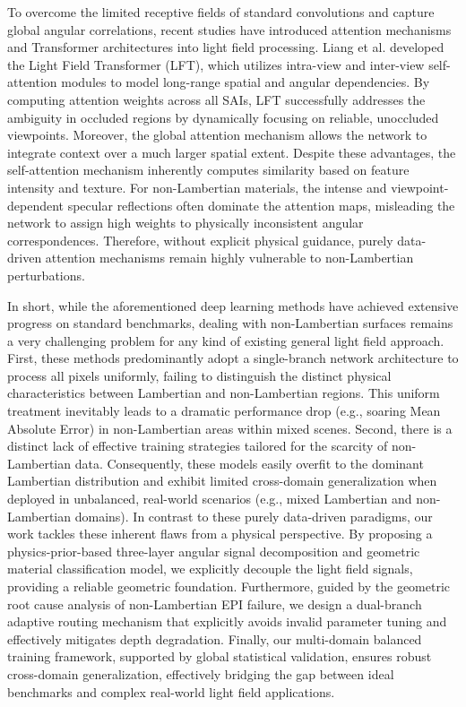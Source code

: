 \documentclass[lettersize,journal]{IEEEtran}
\begin{document}
To overcome the limited receptive fields of standard convolutions and capture global angular correlations, recent studies have introduced attention mechanisms and Transformer architectures into light field processing. Liang et al. \cite{LiangLightFieldTransformer} developed the Light Field Transformer (LFT), which utilizes intra-view and inter-view self-attention modules to model long-range spatial and angular dependencies. By computing attention weights across all SAIs, LFT successfully addresses the ambiguity in occluded regions by dynamically focusing on reliable, unoccluded viewpoints. Moreover, the global attention mechanism allows the network to integrate context over a much larger spatial extent. Despite these advantages, the self-attention mechanism inherently computes similarity based on feature intensity and texture. For non-Lambertian materials, the intense and viewpoint-dependent specular reflections often dominate the attention maps, misleading the network to assign high weights to physically inconsistent angular correspondences. Therefore, without explicit physical guidance, purely data-driven attention mechanisms remain highly vulnerable to non-Lambertian perturbations.

In short, while the aforementioned deep learning methods have achieved extensive progress on standard benchmarks, dealing with non-Lambertian surfaces remains a very challenging problem for any kind of existing general light field approach. First, these methods predominantly adopt a single-branch network architecture to process all pixels uniformly, failing to distinguish the distinct physical characteristics between Lambertian and non-Lambertian regions. This uniform treatment inevitably leads to a dramatic performance drop (e.g., soaring Mean Absolute Error) in non-Lambertian areas within mixed scenes. Second, there is a distinct lack of effective training strategies tailored for the scarcity of non-Lambertian data. Consequently, these models easily overfit to the dominant Lambertian distribution and exhibit limited cross-domain generalization when deployed in unbalanced, real-world scenarios (e.g., mixed Lambertian and non-Lambertian domains). In contrast to these purely data-driven paradigms, our work tackles these inherent flaws from a physical perspective. By proposing a physics-prior-based three-layer angular signal decomposition and geometric material classification model, we explicitly decouple the light field signals, providing a reliable geometric foundation. Furthermore, guided by the geometric root cause analysis of non-Lambertian EPI failure, we design a dual-branch adaptive routing mechanism that explicitly avoids invalid parameter tuning and effectively mitigates depth degradation. Finally, our multi-domain balanced training framework, supported by global statistical validation, ensures robust cross-domain generalization, effectively bridging the gap between ideal benchmarks and complex real-world light field applications.
\end{document}
